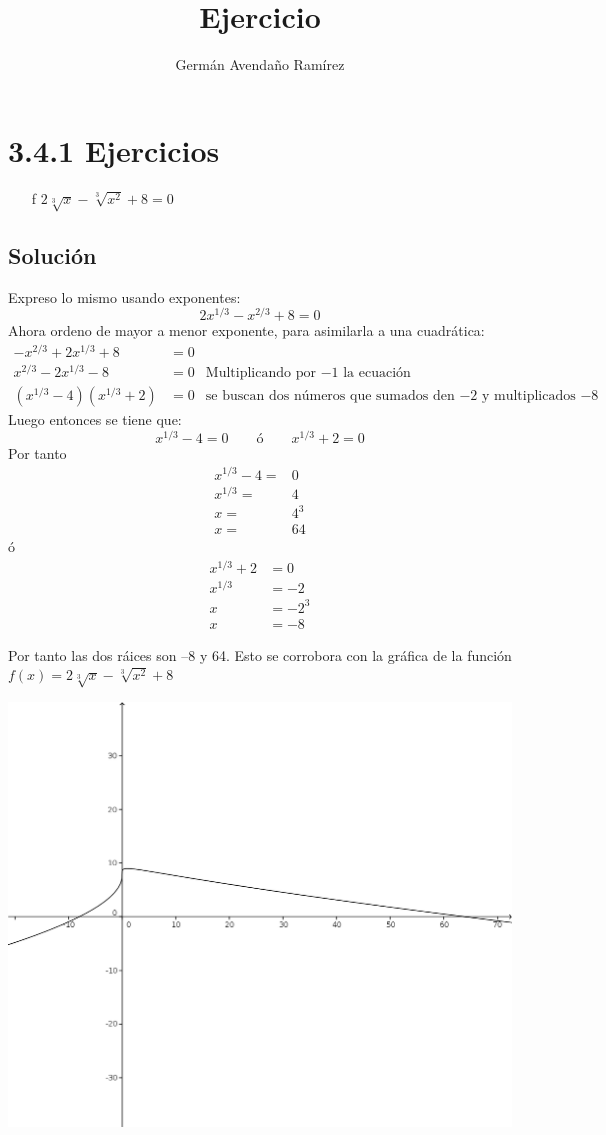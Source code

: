 \documentclass[10pt,a4paper]{article}
\author{Germán Avendaño Ramírez}
\title{Ejercicio}
\begin{document}
\section*{3.4.1 Ejercicios}
\begin{enumerate}
\item[f] $2\sqrt[3]{x}-\sqrt[3]{x^2}+8=0$
\end{enumerate}
\subsection*{Soluci\'on}
Expreso lo mismo usando exponentes:
\[2x^{1/3}-x^{2/3}+8=0\]
Ahora ordeno de mayor a menor exponente, para asimilarla a una cuadrática:
\begin{align*}
-x^{2/3}+2x^{1/3}+8&=0 &\\
x^{2/3}-2x^{1/3}-8&=0 & \mbox{Multiplicando por $-1$ la ecuación}\\
(x^{1/3}-4)(x^{1/3}+2)&=0 & \mbox{se buscan dos números que sumados den $-2$ y multiplicados $-8$}
\end{align*}
Luego entonces se tiene que:
\[x^{1/3}-4=0 \qquad \mbox{ó} \qquad x^{1/3}+2=0\]
Por tanto
\begin{align*}
x^{1/3}-4=&0\\
x^{1/3}=&4\\
x=&4^{3}\\
x=&64
\end{align*}
ó
\begin{align*}
x^{1/3}+2&=0\\
x^{1/3}&=-2\\
x&=-2^{3}\\
x&=-8
\end{align*}

Por tanto las dos ráices son --8 y 64. 
Esto se corrobora con la gráfica de la función $f(x)=2\sqrt[3]{x}-\sqrt[3]{x^{2}}+8$
\begin{center}
\includegraphics[scale=1]{Images/funcion.png} 
\end{center}
\end{document}
